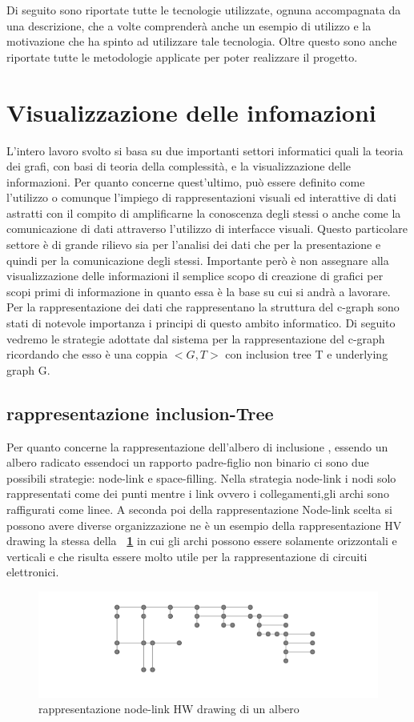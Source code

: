 \large{
Di seguito sono riportate tutte le tecnologie utilizzate, ognuna accompagnata da una descrizione, che a volte comprenderà anche un esempio di utilizzo e la motivazione che ha spinto ad utilizzare tale tecnologia. Oltre questo sono anche riportate tutte le metodologie applicate per poter realizzare il progetto.

\section{Visualizzazione delle infomazioni}
L'intero lavoro svolto si basa su due importanti settori informatici quali la teoria dei grafi, con basi di teoria della complessità, e la visualizzazione delle informazioni. Per quanto concerne quest'ultimo, può essere definito come l'utilizzo o comunque l'impiego di rappresentazioni visuali ed interattive di dati astratti con il compito di amplificarne la conoscenza degli stessi o anche come la comunicazione di dati attraverso l'utilizzo di interfacce visuali. Questo particolare settore è di grande rilievo sia per l'analisi dei dati che per la presentazione e quindi per la comunicazione degli stessi. Importante però è non assegnare alla visualizzazione delle informazioni il semplice scopo di creazione di grafici per scopi primi di informazione in quanto essa è la base su cui si andrà a lavorare. \\
Per la rappresentazione dei dati che rappresentano la struttura del c-graph sono stati di notevole importanza i principi di questo ambito informatico.
Di seguito vedremo le strategie adottate dal sistema per la rappresentazione del c-graph ricordando che esso è una coppia $<G,T>$ con inclusion tree T e underlying graph G. 

\subsection{rappresentazione inclusion-Tree}
Per quanto concerne la rappresentazione dell'albero di inclusione , essendo un albero radicato essendoci un rapporto padre-figlio non binario ci sono due possibili strategie: node-link e space-filling.
Nella strategia node-link i nodi solo rappresentati come dei punti mentre i link ovvero i collegamenti,gli archi sono raffigurati come linee. A seconda poi della rappresentazione Node-link scelta si possono avere diverse organizzazione ne è un esempio della rappresentazione HV drawing la stessa della \textbf{\figurename~\ref{fig:nodeLink}} in cui gli archi possono essere solamente orizzontali e verticali e che risulta essere molto utile per la rappresentazione di circuiti elettronici.
\begin{figure}[!htb]
	\begin{center}
		\includegraphics[width=0.6 \linewidth]{figure/nodeLink}
	\end{center}
	\caption{rappresentazione node-link HW drawing di un albero \label{fig:nodeLink}}
\end{figure}

}
